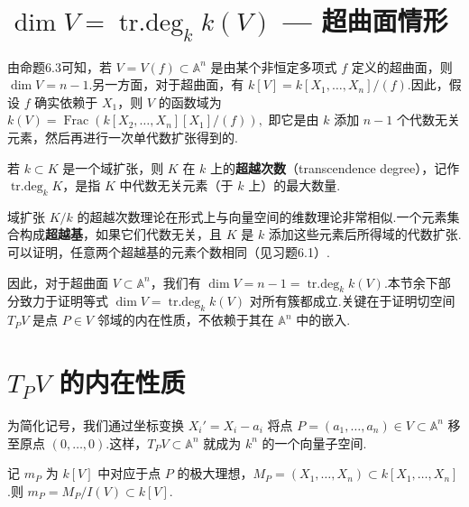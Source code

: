 \section{\(\dim V = \operatorname{tr.deg}_k k(V)\) — 超曲面情形}

由命题6.3可知，若 \(V = V(f) \subset \mathbb{A}^n\) 是由某个非恒定多项式 \(f\) 定义的超曲面，则 \(\dim V = n-1\).另一方面，对于超曲面，有 \(k[V] = k[X_1, \ldots, X_n]/(f)\).因此，假设 \(f\) 确实依赖于 \(X_1\)，则 \(V\) 的函数域为
\(
k(V) = \operatorname{Frac}(k[X_2, \ldots, X_n][X_1]/(f)),
\)
即它是由 \(k\) 添加 \(n-1\) 个代数无关元素，然后再进行一次单代数扩张得到的.

\begin{definition}
若 \(k \subset K\) 是一个域扩张，则 \(K\) 在 \(k\) 上的\textbf{超越次数}（transcendence degree），记作 \(\operatorname{tr.deg}_k K\)，是指 \(K\) 中代数无关元素（于 \(k\) 上）的最大数量.
\end{definition}

域扩张 \(K/k\) 的超越次数理论在形式上与向量空间的维数理论非常相似.一个元素集合构成\textbf{超越基}，如果它们代数无关，且 \(K\) 是 \(k\) 添加这些元素后所得域的代数扩张.可以证明，任意两个超越基的元素个数相同（见习题6.1）.

因此，对于超曲面 \(V \subset \mathbb{A}^n\)，我们有 \(\dim V = n-1 = \operatorname{tr.deg}_k k(V)\).本节余下部分致力于证明等式 \(\dim V = \operatorname{tr.deg}_k k(V)\) 对所有簇都成立.关键在于证明切空间 \(T_P V\) 是点 \(P \in V\) 邻域的内在性质，不依赖于其在 \(\mathbb{A}^n\) 中的嵌入.

\section{\(T_P V\) 的内在性质}

为简化记号，我们通过坐标变换 \(X_i' = X_i - a_i\) 将点 \(P = (a_1, \ldots, a_n) \in V \subset \mathbb{A}^n\) 移至原点 \((0, \ldots, 0)\).这样，\(T_P V \subset \mathbb{A}^n\) 就成为 \(k^n\) 的一个向量子空间.

记 \(m_P\) 为 \(k[V]\) 中对应于点 \(P\) 的极大理想，\(M_P = (X_1, \ldots, X_n) \subset k[X_1, \ldots, X_n]\).则 \(m_P = M_P/I(V) \subset k[V]\).

